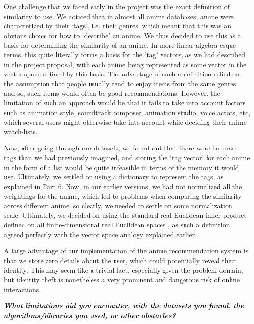\documentclass[12pt]{article}
\begin{document}
\begin{enumerate}
\begin{text}
One challenge that we faced early in the project was the exact definition of similarity to use. We noticed that in almost all anime databases, anime were characterized by their `tags', i.e. their genres, which meant that this was an obvious choice for how to `describe' an anime. We thus decided to use this as a basis for determining the similarity of an anime. In more linear-algebra-esque terms, this quite literally forms a basis for the `tag' vectors, as we had described in the project proposal, with each anime being represented as some vector in the vector space defined by this basis. The advantage of such a definition relied on the assumption that people usually tend to enjoy items from the same genres, and so, such items would often be good recommendations. However, the limitation of such an approach would be that it fails to take into account factors such as animation style, soundtrack composer, animation studio, voice actors, etc, which several users might otherwise take into account while deciding their anime watch-lists.

Now, after going through our datasets, we found out that there were far more tags than we had previously imagined, and storing the `tag vector' for each anime in the form of a list would be quite infeasible in terms of the memory it would use. Ultimately, we settled on using a dictionary to represent the tags, as explained in Part 6. Now, in our earlier versions, we had not normalized all the weightings for the anime, which led to problems when comparing the similarity across different anime, so clearly, we needed to settle on some normalization scale. Ultimately, we decided on using the standard real Euclidean inner product defined on all finite-dimensional real Euclidean spaces \citep{Euclinn}, as such a definition agreed perfectly with the vector space analogy explained earlier.

A large advantage of our implementation of the anime recommendation system is that we store zero details about the user, which could potentially reveal their identity. This may seem like a trivial fact, especially given the problem domain, but identity theft is nonetheless a very prominent and dangerous risk of online interactions.

\bigskip

\textbf{\textit{What limitations did you encounter, with the datasets you found, the algorithms/libraries you used, or other obstacles?}}


\end{text}
\end{enumerate}
\end{document}
